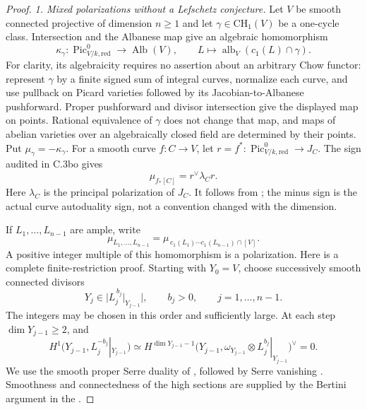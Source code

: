 \begin{proof}
\emph{1. Mixed polarizations without a Lefschetz conjecture.}
Let $V$ be smooth connected projective of dimension $n\ge1$ and
let $\gamma\in\mathrm{CH}_1(V)$ be a one-cycle class.
Intersection and the Albanese map give an algebraic homomorphism
\[
 \kappa_\gamma:\operatorname{Pic}^0_{V/k,\mathrm{red}}
           \longrightarrow\operatorname{Alb}(V),\qquad
 L\longmapsto\operatorname{alb}_V(c_1(L)\cap\gamma).
\]
For clarity, its algebraicity requires no assertion about an
arbitrary Chow functor: represent $\gamma$ by a finite signed
sum of integral curves, normalize each curve, and use pullback
on Picard varieties followed by its Jacobian-to-Albanese
pushforward. Proper pushforward and divisor intersection give
the displayed map on points. Rational equivalence of
$\gamma$ does not change that map, and maps of abelian varieties
over an algebraically closed field are determined by their points.
Put $\mu_\gamma=-\kappa_\gamma$.
For a smooth curve $f:C\to V$, let
$r=f^*:\operatorname{Pic}^0_{V/k,\mathrm{red}}\to J_C$.
The sign audited in C.3bo gives
\begin{equation}
                 \mu_{f_*[C]}=r^\vee\lambda_Cr.
                                                        \tag{MA.5}
\end{equation}
Here $\lambda_C$ is the principal polarization of $J_C$.
It follows from
\citet[Lemma 6.9 and Remark 6.10(c), author p.~23]
{D_MilneJacobians2021}; the minus sign is the actual curve
autoduality sign, not a convention changed with the dimension.

If $L_1,\ldots,L_{n-1}$ are ample, write
\[
 \mu_{L_1,\ldots,L_{n-1}}
   =\mu_{\,c_1(L_1)\cdots c_1(L_{n-1})\cap[V]}.
\]
A positive integer multiple of this homomorphism is a polarization.
Here is a complete finite-restriction proof.
Starting with $Y_0=V$, choose successively smooth connected
divisors
\[
 Y_j\in\big|L_j^{\,b_j}|_{Y_{j-1}}\big|,
 \qquad b_j>0,\qquad j=1,\ldots,n-1.
\]
The integers may be chosen in this order and sufficiently large.
At each step $\dim Y_{j-1}\ge2$, and
\begin{equation}
 H^1\bigl(Y_{j-1},L_j^{-b_j}|_{Y_{j-1}}\bigr)
 \simeq
 H^{\dim Y_{j-1}-1}
 \bigl(Y_{j-1},\omega_{Y_{j-1}}\otimes
                        L_j^{b_j}|_{Y_{j-1}}\bigr)^\vee
 =0.                                                    \tag{MA.6}
\end{equation}
We use the smooth proper Serre duality of
\citet[Lemma 48.27.1(5),(7), Lemma 48.27.5(4), and
Remark 48.27.6]{D_Stacks0FVU}, followed by Serre vanishing
\citep[Lemma 30.17.1]{frC3azStacksSerre}.
Smoothness and connectedness of the high sections are supplied
by the Bertini argument in the
\citet[proof of Lemma 45.8.3]{frC3azStacksBertini}.


\end{proof}
